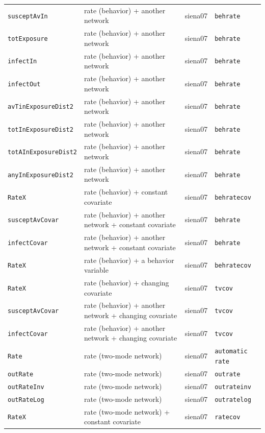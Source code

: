 \begin{longtable}{@{}p{2.6cm}p{3.2cm}p{2.9cm}p{5.4cm}@{}}
\texttt{susceptAvIn} & rate (behavior) + another network & siena07 & \texttt{behrate}\\
\texttt{totExposure} & rate (behavior) + another network & siena07 & \texttt{behrate}\\
\texttt{infectIn} & rate (behavior) + another network & siena07 & \texttt{behrate}\\
\texttt{infectOut} & rate (behavior) + another network & siena07 & \texttt{behrate}\\
\texttt{avTinExposureDist2} & rate (behavior) + another network & siena07 & \texttt{behrate}\\
\texttt{totInExposureDist2} & rate (behavior) + another network & siena07 & \texttt{behrate}\\
\texttt{totAInExposureDist2} & rate (behavior) + another network & siena07 & \texttt{behrate}\\
\texttt{anyInExposureDist2} & rate (behavior) + another network & siena07 & \texttt{behrate}\\
\texttt{RateX} & rate (behavior) + constant covariate & siena07 & \texttt{behratecov}\\
\texttt{susceptAvCovar} & rate (behavior) + another network + constant covariate & siena07 & \texttt{behrate}\\
\texttt{infectCovar} & rate (behavior) + another network + constant covariate & siena07 & \texttt{behrate}\\
\texttt{RateX} & rate (behavior) + a behavior variable & siena07 & \texttt{behratecov}\\
\texttt{RateX} & rate (behavior) + changing covariate & siena07 & \texttt{tvcov}\\
\texttt{susceptAvCovar} & rate (behavior) + another network + changing covariate & siena07 & \texttt{tvcov}\\
\texttt{infectCovar} & rate (behavior) + another network + changing covariate & siena07 & \texttt{tvcov}\\
\texttt{Rate} & rate (two-mode network) & siena07 & \texttt{automatic rate}\\
\texttt{outRate} & rate (two-mode network) & siena07 & \texttt{outrate}\\
\texttt{outRateInv} & rate (two-mode network) & siena07 & \texttt{outrateinv}\\
\texttt{outRateLog} & rate (two-mode network) & siena07 & \texttt{outratelog}\\
\texttt{RateX} & rate (two-mode network) + constant covariate & siena07 & \texttt{ratecov}\\

\end{longtable}
